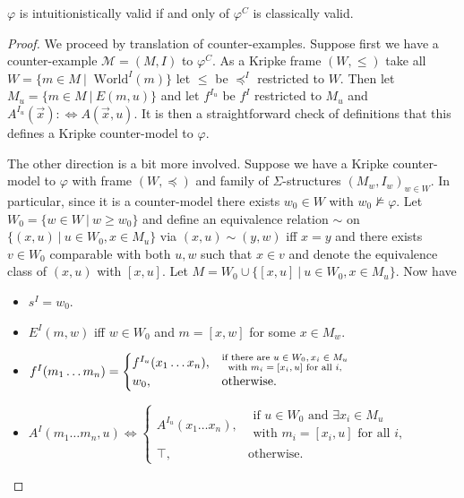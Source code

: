 \documentclass[runningheads]{llncs}
\begin{document}
\begin{lemma}\label{proof:fo-simplification}
	$\varphi$ is intuitionistically valid if and only of $\varphi^C$ is classically valid.
\end{lemma}

\begin{proof}
	We proceed by translation of counter-examples. Suppose first we have a counter-example $\mathcal M = (M, I)$ to $\varphi^C$. As a Kripke frame $(W, \leq)$ take all $ W = \{m\in M\:|\:\text{ World}^I(m)\}$ let $\leq$ be $\preceq^I$ restricted to $W$. Then let $M_u = \{m\in M\:|\: E(m, u)\}$ and let $f^{I_u}$ be $f^I$ restricted to $M_u$ and $A^{I_u}(\vec x): \Leftrightarrow A(\vec x, u)$. It is then a straightforward check of definitions that this defines a Kripke counter-model to $\varphi$.
	
	The other direction is a bit more involved. Suppose we have a Kripke counter-model to $\varphi$ with frame $(W, \preceq)$ and family of $\Sigma$-structures $(M_w, I_w)_{w\in W}$. In particular, since it is a counter-model there exists $w_0\in W$ with $w_0\not\models\varphi$. Let $W_0 = \{w\in W\:|\: w\geq w_0\}$ and define an equivalence relation $\sim$ on $\{(x, u)\:|\:u\in W_0, x\in M_u\}$ via $(x, u)\sim (y, w)$ iff $x = y$ and there exists $v\in W_0$ comparable with both $u, w$ such that $x\in v$ and denote the equivalence class of $(x, u)$ with $[x, u]$. Let $M = W_0\cup \{[x, u]\:|\:u\in W_0, x\in M_u\}$.
	Now have
	\begin{itemize}
		\item $s^I = w_0$.
		\item $E^I(m, w)$ iff $w\in W_0$ and $m = [x, w]$ for some $x\in M_w$.
		\item $f^I(m_1\dots m_n) =\begin{cases}
			f^{I_u}(x_1\dots x_n), &\substack{\text{if there are $ u\in W_0, x_i\in M_u$}\\ \text{with $m_i= [x_i, u]$ for all $i$,}}\\
			w_0, & \text{otherwise.}
		\end{cases}$
		\item ${A}^I(m_1\dots m_n, u) \Leftrightarrow\begin{cases}
			A^{I_u}(x_1\dots x_n), &\substack{\text{if $u\in W_0$ and $\exists x_i\in M_u$}\\\text{with $m_i= [x_i, u]$ for all $i$,}}\\
			\top, & \text{otherwise.}
		\end{cases}$
	\end{itemize}

\end{proof}
\end{document}
